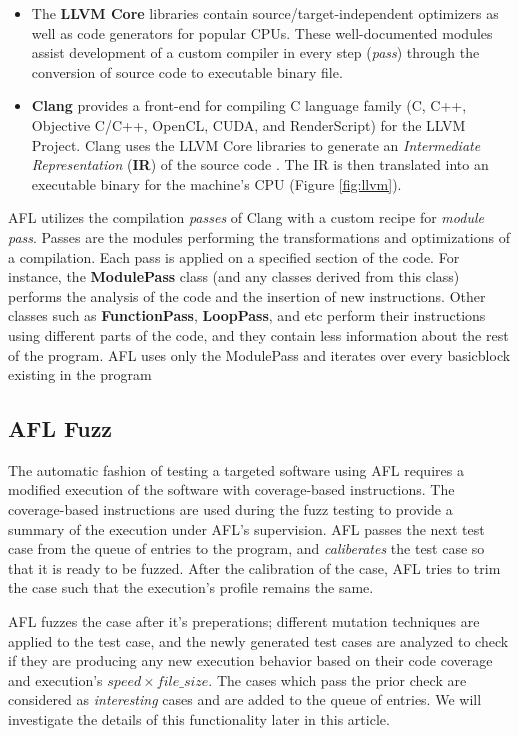 \begin{itemize}
    \item The \textbf{LLVM Core} libraries contain source/target-independent optimizers as well as code generators for popular CPUs. These well-documented modules assist development of a custom compiler in every step (\textit{pass}) through the conversion of source code to executable binary file.
    
    \item \textbf{Clang} \cite{clang} provides a front-end for compiling C language family (C, C++, Objective C/C++, OpenCL, CUDA, and RenderScript) for the LLVM Project. Clang uses the LLVM Core libraries to generate an \textit{Intermediate Representation} (\textbf{IR}) of the source code \cite{lattner2004llvm}. The IR is then translated into an executable binary for the machine's CPU (Figure \ref{fig:llvm}).
\end{itemize}

AFL utilizes the compilation \textit{passes} of Clang with a custom recipe for \textit{module pass}. Passes are the modules performing the transformations and optimizations of a compilation. Each pass is applied on a specified section of the code. For instance, the \textbf{ModulePass} class (and any classes derived from this class) performs the analysis of the code and the insertion of new instructions. Other classes such as \textbf{FunctionPass}, \textbf{LoopPass}, and etc perform their instructions using different parts of the code, and they contain less information about the rest of the program. AFL uses only the ModulePass and iterates over every basicblock existing in the program

\subsection{AFL Fuzz}

The automatic fashion of testing a targeted software using AFL requires a modified execution of the software with coverage-based instructions. The coverage-based instructions are used during the fuzz testing to provide a summary of the execution under AFL's supervision. AFL passes the next test case from the queue of entries to the program, and \textit{caliberates} the test case so that it is ready to be fuzzed. After the calibration of the case, AFL tries to trim the case such that the execution's profile remains the same.

AFL fuzzes the case after it's preperations; different mutation techniques are applied to the test case, and the newly generated test cases are analyzed to check if they are producing any new execution behavior based on their code coverage and execution's $speed \times file\_size$. The cases which pass the prior check are considered as \textit{interesting} cases and are added to the queue of entries. We will investigate the details of this functionality later in this article. 

